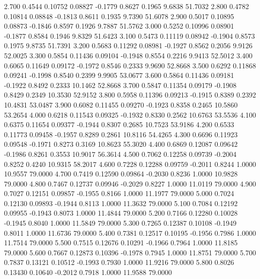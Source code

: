    2.700   0.4544   0.10752   0.08827  -0.1779   0.8627   0.1965   9.6838  51.7032
   2.800   0.4782   0.10814   0.08848  -0.1813   0.8611   0.1935   9.7390  51.6078
   2.900   0.5017   0.10895   0.08873  -0.1846   0.8597   0.1926   9.7887  51.5762
   3.000   0.5252   0.10996   0.08901  -0.1877   0.8584   0.1946   9.8329  51.6423
   3.100   0.5473   0.11119   0.08942  -0.1904   0.8573   0.1975   9.8735  51.7391
   3.200   0.5683   0.11292   0.08981  -0.1927   0.8562   0.2056   9.9126  52.0025
   3.300   0.5854   0.11436   0.09104  -0.1948   0.8554   0.2216   9.9413  52.5012
   3.400   0.6065   0.11649   0.09172  -0.1972   0.8546   0.2333   9.9690  52.8668
   3.500   0.6292   0.11868   0.09241  -0.1998   0.8540   0.2399   9.9905  53.0677
   3.600   0.5864   0.11436   0.09181  -0.1922   0.8492   0.2333  10.1462  52.8668
   3.700   0.5847   0.11354   0.09179  -0.1908   0.8429   0.2349  10.3530  52.9152
   3.800   0.5958   0.11396   0.09213  -0.1915   0.8389   0.2392  10.4831  53.0487
   3.900   0.6082   0.11455   0.09270  -0.1923   0.8358   0.2465  10.5860  53.2654
   4.000   0.6218   0.11543   0.09325  -0.1932   0.8330   0.2562  10.6763  53.5536
   4.100   0.6375   0.11654   0.09377  -0.1944   0.8307   0.2685  10.7523  53.9186
   4.200   0.6533   0.11773   0.09458  -0.1957   0.8289   0.2861  10.8116  54.4265
   4.300   0.6696   0.11923   0.09548  -0.1971   0.8273   0.3169  10.8623  55.3020
   4.400   0.6869   0.12087   0.09642  -0.1986   0.8261   0.3553  10.9017  56.3614
   4.500   0.7062   0.12258   0.09739  -0.2004   0.8252   0.4240  10.9315  58.2017
   4.600   0.7228   0.12288   0.09759  -0.2011   0.8244   1.0000  10.9557  79.0000
   4.700   0.7419   0.12590   0.09864  -0.2030   0.8236   1.0000  10.9828  79.0000
   4.800   0.7467   0.12737   0.09946  -0.2029   0.8227   1.0000  11.0119  79.0000
   4.900   0.7027   0.12151   0.09857  -0.1955   0.8166   1.0000  11.1977  79.0000
   5.000   0.7024   0.12130   0.09893  -0.1944   0.8113   1.0000  11.3632  79.0000
   5.100   0.7084   0.12192   0.09955  -0.1943   0.8073   1.0000  11.4844  79.0000
   5.200   0.7166   0.12280   0.10028  -0.1945   0.8040   1.0000  11.5849  79.0000
   5.300   0.7265   0.12387   0.10108  -0.1949   0.8011   1.0000  11.6736  79.0000
   5.400   0.7381   0.12517   0.10195  -0.1956   0.7986   1.0000  11.7514  79.0000
   5.500   0.7515   0.12676   0.10291  -0.1966   0.7964   1.0000  11.8185  79.0000
   5.600   0.7667   0.12873   0.10396  -0.1978   0.7945   1.0000  11.8751  79.0000
   5.700   0.7837   0.13121   0.10512  -0.1993   0.7930   1.0000  11.9216  79.0000
   5.800   0.8026   0.13430   0.10640  -0.2012   0.7918   1.0000  11.9588  79.0000

